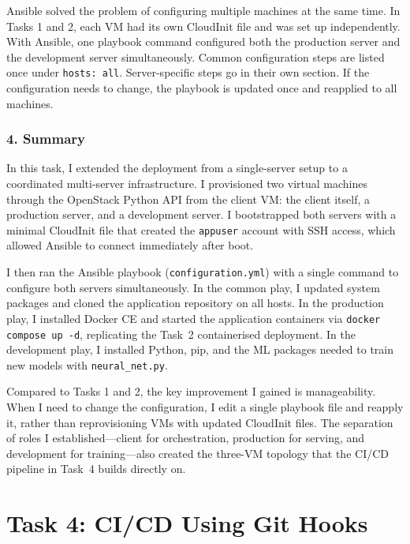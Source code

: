 \documentclass[11pt,a4paper]{article}
\begin{document}
Ansible solved the problem of configuring multiple machines at the same time.
In Tasks 1 and 2, each VM had its own CloudInit file and was set up independently.
With Ansible, one playbook command configured both the production server and the
development server simultaneously.
Common configuration steps are listed once under \texttt{hosts: all}.
Server-specific steps go in their own section.
If the configuration needs to change, the playbook is updated once and reapplied
to all machines.

\subsubsection*{4. Summary}

In this task, I extended the deployment from a single-server setup to a coordinated
multi-server infrastructure. I provisioned two virtual machines through the
OpenStack Python API from the client VM: the client itself, a production server,
and a development server. I bootstrapped both servers with a minimal CloudInit
file that created the \texttt{appuser} account with SSH access, which allowed
Ansible to connect immediately after boot.

I then ran the Ansible playbook (\texttt{configuration.yml}) with a single command
to configure both servers simultaneously. In the common play, I updated system
packages and cloned the application repository on all hosts. In the production
play, I installed Docker CE and started the application containers via
\texttt{docker compose up -d}, replicating the Task~2 containerised deployment.
In the development play, I installed Python, pip, and the ML packages needed to
train new models with \texttt{neural\_net.py}.

Compared to Tasks 1 and 2, the key improvement I gained is manageability.
When I need to change the configuration, I edit a single playbook file and
reapply it, rather than reprovisioning VMs with updated CloudInit files. The
separation of roles I established---client for orchestration, production for
serving, and development for training---also created the three-VM topology
that the CI/CD pipeline in Task~4 builds directly on.


\section{Task 4: CI/CD Using Git Hooks}
\end{document}
